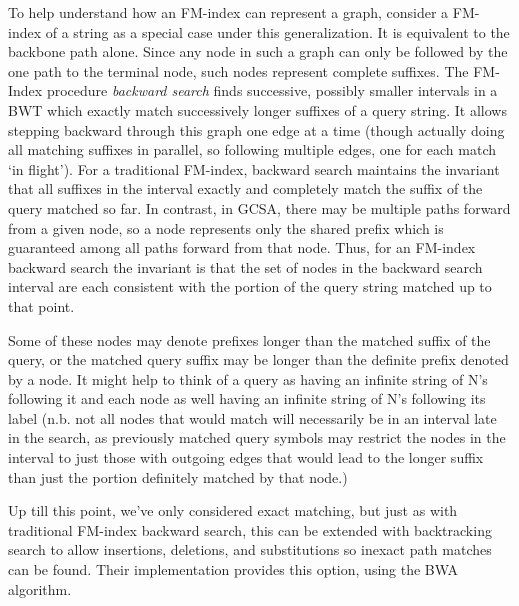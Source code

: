 \documentclass[doctor]{thesis}
\begin{document}
To help understand how an FM-index can represent a graph, consider a FM-index of a string as a special case under this generalization.
It is equivalent to the backbone path alone.
Since any node in such a graph can only be followed by the one path to the terminal node, such nodes represent complete suffixes.
The FM-Index procedure \emph{backward search} finds successive, possibly smaller intervals in a BWT which exactly match successively longer suffixes of a query string. It allows stepping backward through this graph one edge at a time (though actually doing all matching suffixes in parallel, so following multiple edges, one for each match `in flight'). For a traditional FM-index, backward search maintains the invariant that all suffixes in the interval exactly and completely match the suffix of the query matched so far.
In contrast, in GCSA, there may be multiple paths forward from a given node, so a node represents only the shared prefix which is guaranteed among all paths forward from that node.
Thus, for an FM-index backward search  the invariant is that the set of nodes in the backward search interval are each consistent with the portion of the query string matched up to that point.  

Some of these nodes may denote prefixes longer than the matched suffix of the query, or the matched query suffix may be longer than the definite prefix denoted by a node.
It might help to think of a query as having an infinite string of N's following it and each node as well having an infinite string of N's following its label (n.b. not all nodes that would match will necessarily be in an interval late in the search, as previously matched query symbols may restrict the nodes in the interval to just those with outgoing edges that would lead to the longer suffix than just the portion definitely matched by that node.) 

Up till this point, we've only considered exact matching, but just as with traditional FM-index backward search, this can be extended with backtracking search to allow insertions, deletions, and substitutions so inexact path matches can be found.
Their implementation provides this option, using the BWA algorithm.

\end{document}
